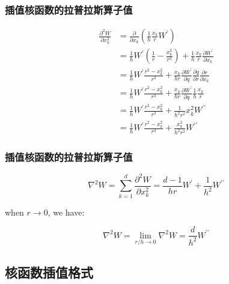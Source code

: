 \begin{frame}
    \frametitle{插值核函数的拉普拉斯算子值}
    
\begin{equation}
    \begin{aligned}
        \frac{\partial^2 W}{\partial x_k^2} &= \frac{\partial}{\partial x_k}\left(
            \frac{1}{h}\frac{x_k}{r}W^\prime
        \right)\\
        &= \frac{1}{h}W^\prime \left(
            \frac{1}{r} - \frac{x_k^2}{r^3}
        \right)+
        \frac{1}{h}\frac{x_k}{r}\frac{\partial W^\prime}{\partial x_k}\\
        &= \frac{1}{h}W^\prime \frac{r^2-x_k^2}{r^3}+
        \frac{x_k}{hr} \frac{\partial W^\prime}{\partial q}\frac{\partial q}{\partial r}\frac{\partial r}{\partial x_k}\\
        &= \frac{1}{h}W^\prime \frac{r^2-x_k^2}{r^3}+
        \frac{x_k}{hr} \frac{\partial W^\prime}{\partial q}\frac{1}{h}\frac{x_k}{r}\\
        &= \frac{1}{h}W^\prime \frac{r^2-x_k^2}{r^3}+
        \frac{1}{h^2r^2}x_k^2 W^{\prime\prime}\\
        &= \frac{1}{h}W^\prime \frac{r^2-x_k^2}{r^3}+
        \frac{x_k^2}{h^2r^2} W^{\prime\prime}
    \end{aligned}
\end{equation}
\end{frame}


\begin{frame}
    \frametitle{插值核函数的拉普拉斯算子值}
    \begin{equation}
        \nabla^2 W = \sum_{k=1}^d \frac{\partial^2 W}{\partial x_k^2} = 
            \frac{d-1}{hr}W^\prime + \frac{1}{h^2}W^{\prime\prime}
    \end{equation}
    
    when $r\to 0$, we have:
    
    \begin{equation}
        \nabla^2 W = \lim_{r/h\to 0} \nabla^2 W = \frac{d}{h^2}W^{\prime\prime}
    \end{equation}
\end{frame}

\subsection{核函数插值格式}

